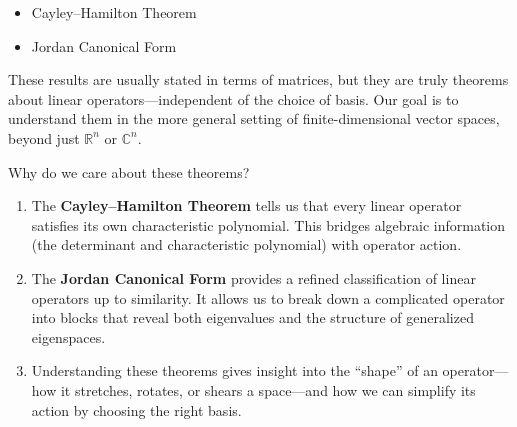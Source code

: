 \begin{itemize}
  \item Cayley–Hamilton Theorem
  \item Jordan Canonical Form
\end{itemize}

These results are usually stated in terms of matrices, but they are truly theorems about linear operators—independent of the choice of basis. Our goal is to understand them in the more general setting of finite-dimensional vector spaces, beyond just \( \mathbb{R}^n \) or \( \mathbb{C}^n \).

\begin{remark}
Why do we care about these theorems?

\begin{enumerate}
  \item The \textbf{Cayley–Hamilton Theorem} tells us that every linear operator satisfies its own characteristic polynomial. This bridges algebraic information (the determinant and characteristic polynomial) with operator action.

  \item The \textbf{Jordan Canonical Form} provides a refined classification of linear operators up to similarity. It allows us to break down a complicated operator into blocks that reveal both eigenvalues and the structure of generalized eigenspaces.

  \item Understanding these theorems gives insight into the “shape” of an operator—how it stretches, rotates, or shears a space—and how we can simplify its action by choosing the right basis.
\end{enumerate}
\end{remark}